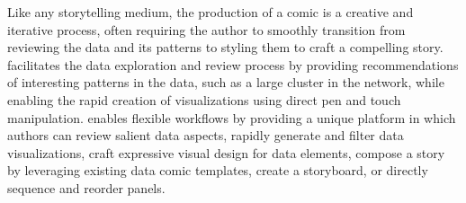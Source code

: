 Like any storytelling medium, the production of a comic is a creative and iterative process, often requiring the author to smoothly transition from reviewing the data and its patterns to styling them to craft a compelling story. \toolname{} facilitates the data exploration and review process by providing recommendations of interesting patterns in the data, such as a large cluster in the network, while enabling the rapid creation of visualizations using direct pen and touch manipulation. \toolname{} enables flexible workflows by providing a unique platform in which authors can review salient data aspects, rapidly generate and filter data visualizations, craft expressive visual design for data elements, compose a story by leveraging existing data comic templates, create a storyboard, or directly sequence and reorder panels. 
